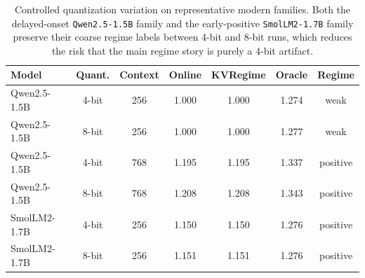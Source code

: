 \begin{table}[t]
\centering
\caption{Controlled quantization variation on representative modern families. Both the delayed-onset \texttt{Qwen2.5-1.5B} family and the early-positive \texttt{SmolLM2-1.7B} family preserve their coarse regime labels between 4-bit and 8-bit runs, which reduces the risk that the main regime story is purely a 4-bit artifact.}
\label{tab:quantization-variation}
\begin{tabular}{lcccccc}
\toprule
Model & Quant. & Context & Online & KVRegime & Oracle & Regime \\
\midrule
Qwen2.5-1.5B & 4-bit & 256 & 1.000 & 1.000 & 1.274 & weak \\
Qwen2.5-1.5B & 8-bit & 256 & 1.000 & 1.000 & 1.277 & weak \\
Qwen2.5-1.5B & 4-bit & 768 & 1.195 & 1.195 & 1.337 & positive \\
Qwen2.5-1.5B & 8-bit & 768 & 1.208 & 1.208 & 1.343 & positive \\
SmolLM2-1.7B & 4-bit & 256 & 1.150 & 1.150 & 1.276 & positive \\
SmolLM2-1.7B & 8-bit & 256 & 1.151 & 1.151 & 1.276 & positive \\
\bottomrule
\end{tabular}
\end{table}
